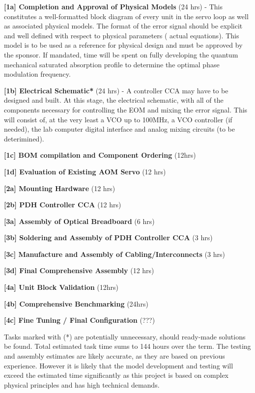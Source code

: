 \begin{packed_itemize}
  \item{\textbf{[1a] Completion and Approval of Physical Models} (24 hrs)}
  - This constitutes a well-formatted block diagram of every unit in the servo
  loop as well as associated physical models. The format of the error signal
  should be explicit and well defined with respect to physical parameters (
  actual equations). This model is to be used as a reference for physical
  design and must be approved by the sponsor. If mandated, time will be spent on
  fully developing the quantum mechanical saturated absorption profile to
  determine the optimal phase modulation frequency.
  \item{\textbf{[1b] Electrical Schematic*} (24 hrs)}
  - A controller CCA may have to be designed and built. At this stage,
  the electrical schematic, with all of the components necessary for controlling
  the EOM and mixing the error signal. This will consist of, at the very least
  a VCO up to 100MHz, a VCO controller (if needed), the lab computer digital
  interface and analog mixing circuits (to be deterimined).
  \item{\textbf{[1c] BOM compilation and Component Ordering} (12hrs)}
  \item{\textbf{[1d] Evaluation of Existing AOM Servo} (12 hrs)}
  \item{\textbf{[2a] Mounting Hardware}} (12 hrs)
  \item{\textbf{[2b] PDH Controller CCA} (12 hrs)}
  \item{\textbf{[3a] Assembly of Optical Breadboard} (6 hrs)}
  \item{\textbf{[3b] Soldering and Assembly of PDH Controller CCA} (3 hrs)}
  \item{\textbf{[3c] Manufacture and Assembly of Cabling/Interconnects} (3 hrs)}
  \item{\textbf{[3d] Final Comprehensive Assembly} (12 hrs)}
  \item{\textbf{[4a] Unit Block Validation} (12hrs)}
  \item{\textbf{[4b] Comprehensive Benchmarking} (24hrs)}
  \item{\textbf{[4c] Fine Tuning / Final Configuration} (???)}
\end{packed_itemize}

Tasks marked with (*) are potentially unnecessary, should ready-made solutions
be found. Total estimated task time sums to 144 hours over the term. The testing
and assembly estimates are likely accurate, as they are based on previous
experience. However it is likely that the model development and testing will
exceed the estimated time significantly as this project is based on complex
physical principles and has high technical demands.


